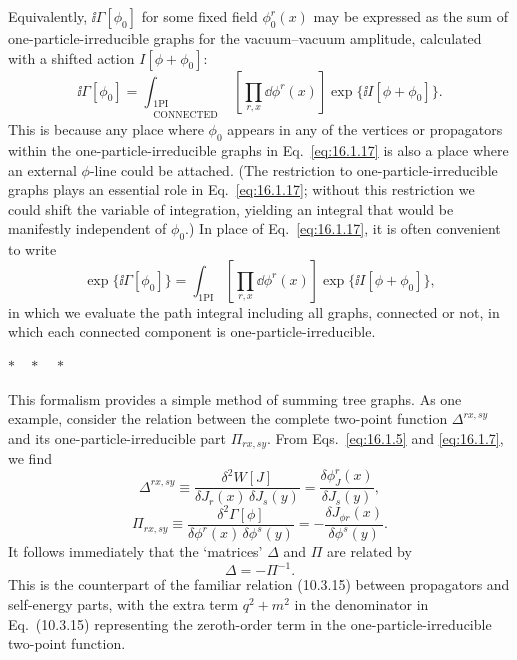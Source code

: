 Equivalently, $\ii\Gamma[\phi_0]$ for some fixed field $\phi_0^r(x)$ may be expressed as the
sum of one-particle-irreducible graphs for the vacuum--vacuum amplitude,
calculated with a shifted action $I[\phi+\phi_0]$:
\begin{equation}
\ii\Gamma[\phi_0]=\int_{\substack{\mathrm{1PI}\\\mathrm{CONNECTED}}}
\left[\prod_{r,x}\dd\phi^r(x)\right]\exp\{\ii I[\phi+\phi_0]\}.
\label{eq:16.1.17}
\end{equation}
This is because any place where $\phi_0$ appears in any of the vertices or
propagators within the one-particle-irreducible graphs in Eq.\ \eqref{eq:16.1.17} is
also a place where an external $\phi$-line could be attached. (The restriction
to one-particle-irreducible graphs plays an essential role in Eq.\ \eqref{eq:16.1.17};
without this restriction we could shift the variable of integration, yielding
an integral that would be manifestly independent of $\phi_0$.) In place of
Eq.\ \eqref{eq:16.1.17}, it is often convenient to write
\begin{equation}
\exp\{\ii\Gamma[\phi_0]\}=\int_{\mathrm{1PI}}
\left[\prod_{r,x}\dd\phi^r(x)\right]\exp\{\ii I[\phi+\phi_0]\},
\label{eq:16.1.18}
\end{equation}
in which we evaluate the path integral including all graphs, connected or
not, in which each connected component is one-particle-irreducible.

\begin{center}
$*\quad*\quad*$
\end{center}

This formalism provides a simple method of summing tree graphs. As
one example, consider the relation between the complete two-point function
$\Delta^{rx,sy}$ and its one-particle-irreducible part $\Pi_{rx,sy}$. From Eqs.\ \eqref{eq:16.1.5}
and \eqref{eq:16.1.7}, we find
\begin{equation}
\Delta^{rx,sy}\equiv\frac{\delta^2W[J]}{\delta J_r(x)\,\delta J_s(y)}
=\frac{\delta\phi_J^r(x)}{\delta J_s(y)},
\label{eq:16.1.19}
\end{equation}
\begin{equation}
\Pi_{rx,sy}\equiv\frac{\delta^2\Gamma[\phi]}{\delta\phi^r(x)\,\delta\phi^s(y)}
=-\frac{\delta J_{\phi r}(x)}{\delta\phi^s(y)}.
\label{eq:16.1.20}
\end{equation}
It follows immediately that the `matrices' $\Delta$ and $\Pi$ are related by
\begin{equation}
\Delta=-\Pi^{-1}.
\label{eq:16.1.21}
\end{equation}
This is the counterpart of the familiar relation (10.3.15) between propagators
and self-energy parts, with the extra term $q^2+m^2$ in the denominator
in Eq.\ (10.3.15) representing the zeroth-order term in the
one-particle-irreducible two-point function.
